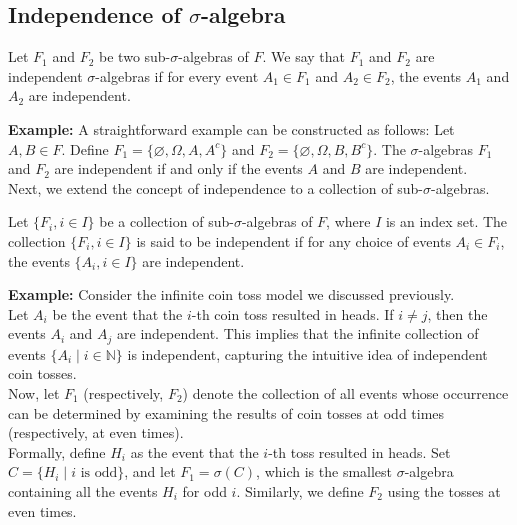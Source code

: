 \subsection{Independence of $\sigma$-algebra}

\begin{definition}
    Let \( F_1 \) and \( F_2 \) be two sub-\(\sigma\)-algebras of \( F \). We say that \( F_1 \) and \( F_2 \) are independent \(\sigma\)-algebras if for every event \( A_1 \in F_1 \) and \( A_2 \in F_2 \), the events \( A_1 \) and \( A_2 \) are independent. 
\end{definition}

\textbf{Example:} A straightforward example can be constructed as follows: Let \( A, B \in F \). Define \( F_1 = \{ \varnothing, \Omega, A, A^c \} \) and \( F_2 = \{ \varnothing, \Omega, B, B^c \} \). The \(\sigma\)-algebras \( F_1 \) and \( F_2 \) are independent if and only if the events \( A \) and \( B \) are independent.\\

Next, we extend the concept of independence to a collection of sub-\(\sigma\)-algebras.

\begin{definition}
    Let \( \{ F_i, i \in I \} \) be a collection of sub-\(\sigma\)-algebras of \( F \), where \( I \) is an index set. The collection \( \{ F_i, i \in I \} \) is said to be independent if for any choice of events \( A_i \in F_i \), the events \( \{ A_i, i \in I \} \) are independent.
\end{definition}

\textbf{Example:} Consider the infinite coin toss model we discussed previously.\\

Let \( A_i \) be the event that the \( i \)-th coin toss resulted in heads. If \( i \neq j \), then the events \( A_i \) and \( A_j \) are independent. This implies that the infinite collection of events \( \{ A_i \mid i \in \mathbb{N} \} \) is independent, capturing the intuitive idea of independent coin tosses.\\

Now, let \( F_1 \) (respectively, \( F_2 \)) denote the collection of all events whose occurrence can be determined by examining the results of coin tosses at odd times (respectively, at even times).\\

Formally, define \( H_i \) as the event that the \( i \)-th toss resulted in heads. Set \( C = \{ H_i \mid i \text{ is odd} \} \), and let \( F_1 = \sigma(C) \), which is the smallest \(\sigma\)-algebra containing all the events \( H_i \) for odd \( i \). Similarly, we define \( F_2 \) using the tosses at even times.\\

